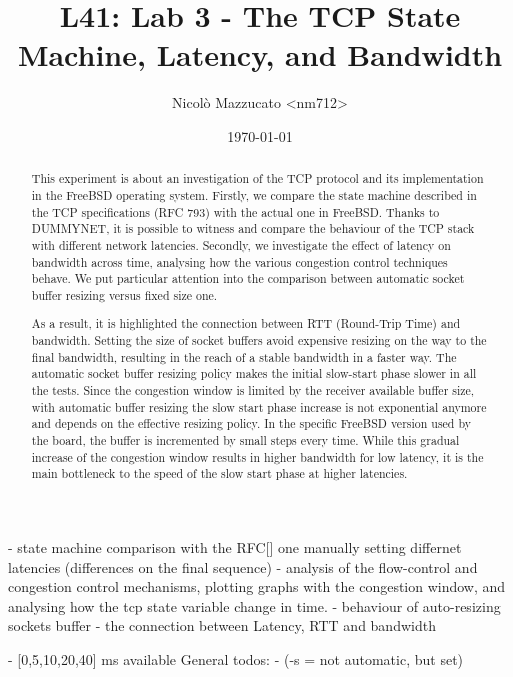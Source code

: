 \documentclass[a4paper,10pt]{article}
\begin{document}
\title{L41: Lab 3 - The TCP State Machine, Latency, and Bandwidth}
\author{Nicolò Mazzucato \textless{}nm712\textgreater{}}
\date{\today}

\maketitle

\thispagestyle{empty}

\begin{abstract}           
   This experiment is about an investigation of the TCP protocol and its implementation in the FreeBSD operating system. Firstly, we compare the state machine described in the TCP specifications (RFC 793\cite{RFC793}) with the actual one in FreeBSD. Thanks to DUMMYNET, it is possible to witness and compare the behaviour of the TCP stack with different network latencies. Secondly, we investigate the effect of latency on bandwidth across time, analysing how the various congestion control techniques behave. We put particular attention into the comparison between automatic socket buffer resizing versus fixed size one.

   As a result, it is highlighted the connection between RTT (Round-Trip Time) and bandwidth.  Setting the size of socket buffers avoid expensive resizing on the way to the final bandwidth, resulting in the reach of a stable bandwidth in a faster way. The automatic socket buffer resizing policy makes the initial slow-start phase slower in all the tests. Since the congestion window is limited by the receiver available buffer size, with automatic buffer resizing the slow start phase increase is not exponential anymore and depends on the effective resizing policy. In the specific FreeBSD version used by the board, the buffer is incremented by small steps every time. While this gradual increase of the congestion window results in higher bandwidth for low latency, it is the main bottleneck to the speed of the slow start phase at higher latencies.
\end{abstract}

\iffalse
- state machine comparison with the RFC[] one manually setting differnet latencies (differences on the final sequence)
   - analysis of the flow-control and congestion control mechanisms, plotting graphs with the congestion window, and analysing how the tcp state variable change in time.
   - behaviour of auto-resizing sockets buffer
   - the connection between Latency, RTT and bandwidth

- [0,5,10,20,40] ms available
General todos:
- (-s = not automatic, but set)
\end{document}
